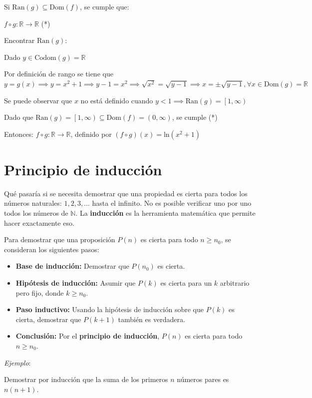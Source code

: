 \documentclass{article}
\begin{document}
Si $\text{Ran}(g) \subseteq \text{Dom}(f)$, se cumple que:

$f \circ g: \mathbb{R} \to \mathbb{R}$ (*)

Encontrar $\text{Ran}(g):$

Dado $y \in \text{Codom}(g) = \mathbb{R}$

Por definición de rango se tiene que $y = g(x) \implies y = x^2 + 1 \implies y - 1 = x^2 \implies \sqrt{x^2} = \sqrt{y - 1} \implies x = \pm \sqrt{y - 1}, \forall x \in \text{Dom}(g) = \mathbb{R}$

Se puede observar que $x$ no está definido cuando $y < 1 \implies \text{Ran}(g) = \left[1, \infty \right)$

Dado que $\text{Ran}(g) = \left[1, \infty \right) \subseteq \text{Dom}(f) = \left(0, \infty \right)$, se cumple (*)

Entonces: $f \circ g: \mathbb{R} \to \mathbb{R}$, definido por $(f \circ g)(x) = \text{ln}(x^2 + 1)$

\section{Principio de inducción}

Qué pasaría si se necesita demostrar que una propiedad es cierta para todos los números naturales: $1, 2, 3, \dots$ hasta el infinito. No es posible verificar uno por uno todos los números de $\mathbb{N}$. La \textbf{inducción} es la herramienta matemática que permite hacer exactamente eso.

Para demostrar que una proposición $P(n)$ es cierta para todo $n \ge n_0$, se consideran los siguientes pasos:

\begin{itemize}
    \item \textbf{Base de inducción:} Demostrar que $P(n_0)$ es cierta.
    \item \textbf{Hipótesis de inducción:} Asumir que $P(k)$ es cierta para un $k$ arbitrario pero fijo, donde $k \ge n_0$.
    \item \textbf{Paso inductivo:} Usando la hipótesis de inducción sobre que $P(k)$ es cierta, demostrar que $P(k + 1)$ también es verdadera.
    \item \textbf{Conclusión:} Por el \textbf{principio de inducción}, $P(n)$ es cierta para todo $n \ge n_0$.
\end{itemize}

\textit{Ejemplo}:

Demostrar por inducción que la suma de los primeros $n$ números pares es $n(n + 1)$.
\end{document}
